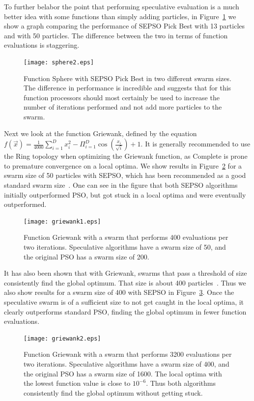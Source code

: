 \documentclass[conference,letterpaper]{IEEEtran}
\newcommand{\fig}[1]{Figure~\ref{fig:#1}}
\begin{document}
To further belabor the point that performing speculative evaluation is a much
better idea with some functions than simply adding particles, in \fig{sphere2}
we show a graph comparing the performance of SEPSO Pick Best with 13 particles
and with 50 particles.  The difference between the two in terms of function
evaluations is staggering.

\begin{figure}
  \texttt{[image: sphere2.eps]}
  \caption{Function Sphere with SEPSO Pick Best in two different swarm sizes.
  The difference in performance is incredible and suggests that for this
  function processors should most certainly be used to increase the number of
  iterations performed and not add more particles to the swarm.}
  \label{fig:sphere2}
\end{figure}

Next we look at the function Griewank, defined by the equation $f(\Vec{x}) =
\frac{1}{4000} \sum_{i=1}^D x_i^2 - \Pi_{i=1}^D \cos\left(\frac{x_i}{\sqrt{i}}
\right) + 1$.  It is generally recommended to use the Ring topology when
optimizing the Griewank function, as Complete is prone to premature convergence
on a local optima.  We show results in \fig{griewank1} for a swarm size of 50
particles with SEPSO, which has been recommended as a good standard swarm
size~\cite{bratton-sis07}.  One can see in the figure that both SEPSO
algorithms initially outperformed PSO, but got stuck in a local optima and were
eventually outperformed.  

\begin{figure}
  \texttt{[image: griewank1.eps]}
  \caption{Function Griewank with a swarm that performs 400 evaluations per two
  iterations.  Speculative algorithms have a swarm size of 50, and the original
  PSO has a swarm size of 200.}
  \label{fig:griewank1}
\end{figure}

It has also been shown that with Griewank, swarms that pass a threshold of size
consistently find the global optimum.  That size is about 400
particles~\cite{mcnabb-cec09}.  Thus we also show results for a swarm size of
400 with SEPSO in \fig{griewank2}.  Once the speculative swarm is of a
sufficient size to not get caught in the local optima, it clearly outperforms
standard PSO, finding the global optimum in fewer function evaluations.

\begin{figure}
  \texttt{[image: griewank2.eps]}
  \caption{Function Griewank with a swarm that performs 3200 evaluations per
  two iterations.  Speculative algorithms have a swarm size of 400, and the
  original PSO has a swarm size of 1600.  The local optima with the lowest
  function value is close to $10^{-6}$.  Thus both algorithms consistently find
  the global optimum without getting stuck.}
  \label{fig:griewank2}
\end{figure}
\end{document}
